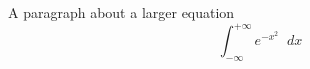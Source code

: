 \documentclass{article}
\newcommand{\diff}{\mathop{}\!d}            %
\begin{document}
A paragraph about a larger equation
\[
\int_{-\infty}^{+\infty} e^{-x^2} \diff x
\]
\end{document}
